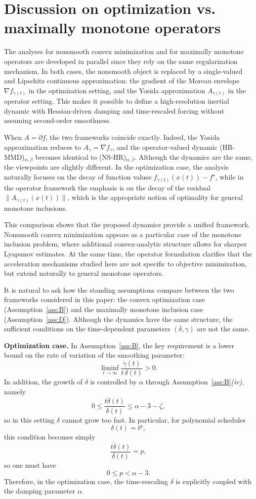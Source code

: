 \documentclass[11pt]{article}
\numberwithin{equation}{section}
\begin{document}
\section{Discussion on optimization vs. maximally monotone operators}
The analyses for nonsmooth convex minimization and for maximally monotone operators are developed in parallel since they rely on the same regularization mechanism. In both cases, the nonsmooth object is replaced by a single-valued and Lipschitz continuous approximation: the gradient of the Moreau envelope $\nabla f_{\gamma(t)}$ in the optimization setting, and the Yosida approximation $A_{\gamma(t)}$ in the operator setting. This makes it possible to define a high-resolution inertial dynamic with Hessian-driven damping and time-rescaled forcing without assuming second-order smoothness.

When $A = \partial f$, the two frameworks coincide exactly. Indeed, the Yosida approximation reduces to $A_\gamma = \nabla f_\gamma$, and the operator-valued dynamic (HR-MMD)$_{\alpha,\beta}$ becomes identical to (NS-HR)$_{\alpha,\beta}$. Although the dynamics are the same, the viewpoints are slightly different. In the optimization case, the analysis naturally focuses on the decay of function values $f_{\gamma(t)}(x(t)) - f^\star$, while in the operator framework the emphasis is on the decay of the residual $\|A_{\gamma(t)}(x(t))\|$, which is the appropriate notion of optimality for general monotone inclusions.

This comparison shows that the proposed dynamics provide a unified framework. Nonsmooth convex minimization appears as a particular case of the monotone inclusion problem, where additional convex-analytic structure allows for sharper Lyapunov estimates. At the same time, the operator formulation clarifies that the acceleration mechanisms studied here are not specific to objective minimization, but extend naturally to general monotone operators.

It is natural to ask how the standing assumptions compare between the two frameworks considered in this paper:
the convex optimization case (Assumption~\ref{ass:B}) and the maximally monotone inclusion case
(Assumption~\ref{ass:D}). Although the dynamics have the same structure, the sufficient conditions on the
time-dependent parameters $(\delta,\gamma)$ are not the same.

\smallskip
\noindent
\textbf{Optimization case.}
In Assumption~\ref{ass:B}, the key requirement is a lower bound on the {rate of variation} of the smoothing
parameter:
\[
\liminf_{t\to\infty}\frac{\dot\gamma(t)}{t\,\delta(t)} > 0.
\]
In addition, the growth of $\delta$ is controlled by $\alpha$ through
Assumption~\ref{ass:B}\textit{(iv)}, namely
\[
0\le\frac{t\dot\delta(t)}{\delta(t)}\le \alpha-3-\zeta,
\]
so in this setting $\delta$ cannot grow too fast. In particular, for polynomial schedules
\[
\delta(t)=t^p,
\]
this condition becomes simply
\[
\frac{t\dot\delta(t)}{\delta(t)}=p,
\]
so one must have
\[
0\le p<\alpha-3.
\]
Therefore, in the optimization case, the time-rescaling $\delta$ is explicitly coupled with the damping
parameter $\alpha$.
\end{document}
